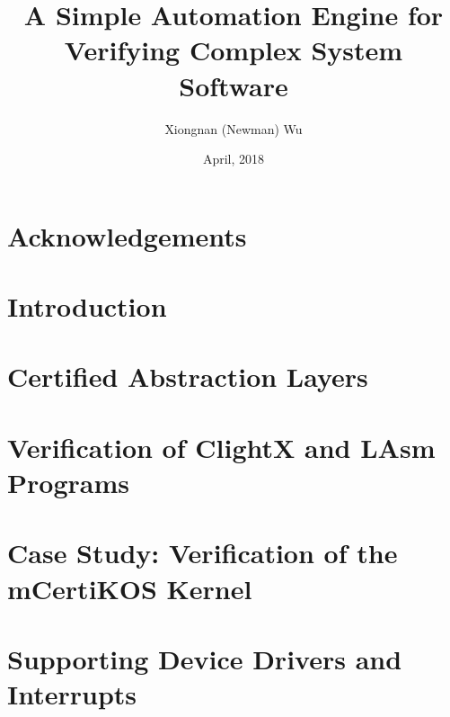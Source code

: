 \documentclass[letterpaper,11pt]{yalephd}
\begin{document}
\title{A Simple Automation Engine for Verifying Complex System Software}
\author{Xiongnan (Newman) Wu}
\date{April, 2018} %

\frontmatter

\begin{abstract}

\end{abstract}


\maketitle
{} %
\tableofcontents
\listoffigures %
\listoftables %

\chapter{Acknowledgements} %


\mainmatter

\chapter{Introduction}

\chapter{Certified Abstraction Layers}
\label{chapter:framework}


\chapter{Verification of ClightX and LAsm Programs}
\label{chapter:automation}


\chapter{Case Study: Verification of the mCertiKOS Kernel}
\label{chapter:sequential}


\chapter{Supporting Device Drivers and Interrupts}
\label{chapter:driver}
\end{document}
